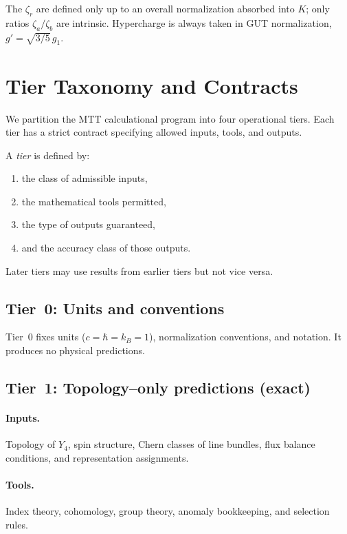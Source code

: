 \documentclass[11pt]{article}
\begin{document}
The $\zeta_r$ are defined only up to an overall normalization absorbed
into $K$; only ratios $\zeta_a/\zeta_b$ are intrinsic.
Hypercharge is always taken in GUT normalization,
$g' = \sqrt{3/5}\,g_1$.

\section{Tier Taxonomy and Contracts}

We partition the MTT calculational program into four operational tiers.
Each tier has a strict contract specifying allowed inputs, tools, and
outputs.

\begin{definition}
A \emph{tier} is defined by:
\begin{enumerate}
  \item the class of admissible inputs,
  \item the mathematical tools permitted,
  \item the type of outputs guaranteed,
  \item and the accuracy class of those outputs.
\end{enumerate}
Later tiers may use results from earlier tiers but not vice versa.
\end{definition}

\subsection{Tier~0: Units and conventions}

Tier~0 fixes units ($c=\hbar=k_B=1$), normalization conventions, and
notation.
It produces no physical predictions.

\subsection{Tier~1: Topology--only predictions (exact)}

\paragraph{Inputs.}
Topology of $Y_4$, spin structure, Chern classes of line bundles, flux
balance conditions, and representation assignments.

\paragraph{Tools.}
Index theory, cohomology, group theory, anomaly bookkeeping, and
selection rules.
\end{document}
